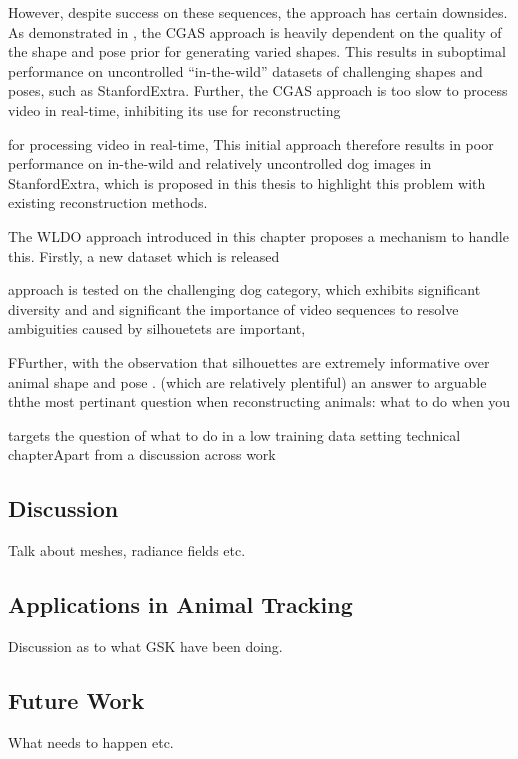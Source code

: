 However, despite success on these sequences, the approach has certain downsides. As demonstrated in , the CGAS approach is heavily dependent on the quality of the shape and pose prior for generating varied shapes. This results in suboptimal performance on uncontrolled ``in-the-wild'' datasets of challenging shapes and poses, such as StanfordExtra. Further, the CGAS approach is too slow to process video in real-time, inhibiting its use for reconstructing 

for processing video in real-time, This initial approach therefore results in poor performance on in-the-wild and relatively uncontrolled dog images in StanfordExtra, which is proposed in this thesis to highlight this problem with existing reconstruction methods. 

The WLDO approach introduced in this chapter proposes a mechanism to handle this. Firstly, a new dataset which is released 

approach is tested on the challenging dog category, which exhibits significant diversity and  and significant the importance of video sequences to resolve ambiguities caused by silhouetets are important,

FFurther, with the observation that silhouettes are extremely informative over animal shape and pose . (which are relatively plentiful) an answer to arguable ththe most pertinant question when reconstructing animals: what to do when you 

targets the question of what to do in a low training data setting technical chapterApart from a discussion across  work 

\subsection{Discussion}

Talk about meshes, radiance fields etc.

\subsection{Applications in Animal Tracking}

Discussion as to what GSK have been doing.

\subsection{Future Work}

What needs to happen etc.

